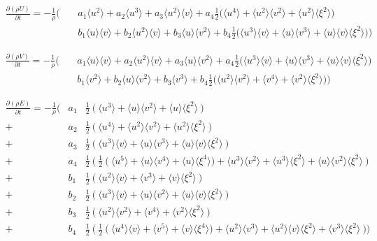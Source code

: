 \documentclass[
	pdftex,             %
	12pt,				%
	a4paper,		   	%
	english,				%
	oneside,			%
]{article}
\newcommand{\mom}[1]{\langle #1 \rangle}
\begin{document}
\begin{eqnarray*}
\frac{\partial (\rho U)}{\partial t}
=
-\frac{1}{\rho}
\Bigg(
&~&a_1 \mom{u^2} + a_2 \mom{u^3} + a_3 \mom{u^2}\mom{v}
+  a_4 \frac{1}{2} \Big( \mom{u^4} + \mom{u^2}\mom{v^2} + \mom{u^2}\mom{\xi^2} \Big)
\\
&~&b_1 \mom{u}\mom{v} + b_2 \mom{u^2}\mom{v} + b_3 \mom{u}\mom{v^2}
+  b_4 \frac{1}{2} \Big( \mom{u^3}\mom{v} + \mom{u}\mom{v^3} + \mom{u}\mom{v}\mom{\xi^2} \Big)
\Bigg)
\end{eqnarray*}

\begin{eqnarray*}
\frac{\partial (\rho V)}{\partial t}
=
-\frac{1}{\rho}
\Bigg(
&~&a_1 \mom{u}\mom{v} + a_2 \mom{u^2}\mom{v} + a_3 \mom{u}\mom{v^2}
+  a_4 \frac{1}{2} \Big( \mom{u^3}\mom{v} + \mom{u}\mom{v^3} + \mom{u}\mom{v}\mom{\xi^2} \Big)
\\
&~&b_1 \mom{v^2} + b_2 \mom{u}\mom{v^2} + b_3 \mom{v^3}
+  b_4 \frac{1}{2} \Big( \mom{u^2}\mom{v^2} + \mom{v^4} + \mom{v^2}\mom{\xi^2} \Big)
\Bigg)
\end{eqnarray*}

\begin{eqnarray*}
\frac{\partial (\rho E)}{\partial t}
=
-\frac{1}{\rho}
\Bigg(
 &a_1& \frac{1}{2}~ \Big(~ \mom{u^3} + \mom{u}\mom{v^2} + \mom{u}\mom{\xi^2} ~\Big) \\
+&a_2& \frac{1}{2}~ \Big(~ \mom{u^4} + \mom{u^2}\mom{v^2} + \mom{u^2}\mom{\xi^2} ~\Big) \\
+&a_3& \frac{1}{2}~ \Big(~ \mom{u^3}\mom{v} + \mom{u}\mom{v^3} + \mom{u}\mom{v}\mom{\xi^2} ~\Big) \\
+&a_4& \frac{1}{2}~ \Big(~ \frac{1}{2}~
					\big(~ \mom{u^5} + \mom{u}\mom{v^4} + \mom{u}\mom{\xi^4} \big)
						 + \mom{u^3}\mom{v^2} + \mom{u^3}\mom{\xi^2} + \mom{u}\mom{v^2}\mom{\xi^2}
					~\Big)
\\
+&b_1& \frac{1}{2}~ \Big(~ \mom{u^2}\mom{v} + \mom{v^3} + \mom{v}\mom{\xi^2} ~\Big) \\
+&b_2& \frac{1}{2}~ \Big(~ \mom{u^3}\mom{v} + \mom{u}\mom{v^2} + \mom{u}\mom{v}\mom{\xi^2} ~\Big) \\
+&b_3& \frac{1}{2}~ \Big(~ \mom{u^2}\mom{v^2} + \mom{v^4} + \mom{v^2}\mom{\xi^2} ~\Big) \\
+&b_4& \frac{1}{2}~ \Big(~ \frac{1}{2}~
					\big(~  \mom{u^4}\mom{v} +\mom{v^5} + \mom{v}\mom{\xi^4} \big)
						 + \mom{u^2}\mom{v^3} + \mom{u^2}\mom{v}\mom{\xi^2} + \mom{v^3}\mom{\xi^2}
					~\Big)
\Bigg)
\end{eqnarray*}
\end{document}
